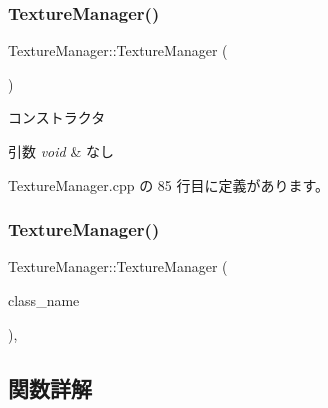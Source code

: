 \subsubsection{\texorpdfstring{Texture\+Manager()}{TextureManager()}\hspace{0.1cm}{\footnotesize\ttfamily [1/2]}}
{\footnotesize\ttfamily Texture\+Manager\+::\+Texture\+Manager (\begin{DoxyParamCaption}{ }\end{DoxyParamCaption})\hspace{0.3cm}{\ttfamily [private]}}



コンストラクタ 


\begin{DoxyParams}{引数}
{\em void} & なし \\
\hline
\end{DoxyParams}


 Texture\+Manager.\+cpp の 85 行目に定義があります。

\mbox{\label{class_texture_manager_a4ef42214937c5c9e58f87c28a079a858}} 
\subsubsection{\texorpdfstring{Texture\+Manager()}{TextureManager()}\hspace{0.1cm}{\footnotesize\ttfamily [2/2]}}
{\footnotesize\ttfamily Texture\+Manager\+::\+Texture\+Manager (\begin{DoxyParamCaption}\item[{const \mbox{\hyperlink{class_texture_manager}{Texture\+Manager}} \&}]{class\+\_\+name }\end{DoxyParamCaption})\hspace{0.3cm}{\ttfamily [private]}, {\ttfamily [delete]}}



\subsection{関数詳解}
\mbox{\label{class_texture_manager_a1686601d7194dc42fdb373d5f76f2af9}} 
